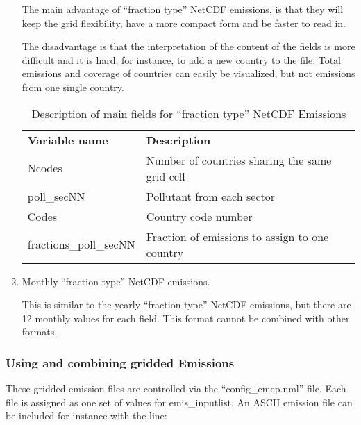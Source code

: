 \begin{enumerate}
The main advantage of ``fraction type'' NetCDF emissions, is that they
will keep the grid flexibility, have a more compact form and be faster
to read in. 

The disadvantage is that the interpretation of the content of the
fields is more difficult and it is hard, for instance, to add a new
country to the file. Total emissions and coverage of countries can
easily be visualized, but not emissions from one single country. 



\begin{table}
\caption{Description of main fields for ``fraction type'' NetCDF Emissions}
\label{Tab:Emisdata}
\begin{center}
\begin{tabular}{lll}
\hline

{\bf Variable name } & {\bf Description}\\

Ncodes & Number of countries sharing the same grid cell\\
poll\_secNN & Pollutant from each sector \\
Codes & Country code number \\
fractions\_poll\_secNN & Fraction of emissions to assign to one country\\

\hline

\end{tabular}
\end{center}
\end{table}





\item Monthly ``fraction type'' NetCDF emissions.

This is similar to the yearly ``fraction type'' NetCDF emissions, but
there are 12 monthly values for each field. This format cannot be
combined with other formats. 

\end{enumerate}

\subsubsection{Using and combining gridded Emissions}

These gridded emission files are controlled via the ``config\_emep.nml'' file.
Each file is assigned as one set of values for emis\_inputlist.
An ASCII emission file can be included for instance with the line:


